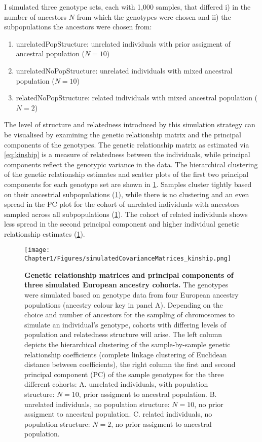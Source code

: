 I simulated three genotype sets, each with 1,000 samples, that differed i) in the number of ancestors \(N\) from which the genotypes were chosen and ii) the subpopulations the ancestors were chosen from:
\begin{enumerate}
\item unrelatedPopStructure: unrelated individuals with prior assigment of ancestral population  (\(N=10\))
\item unrelatedNoPopStructure: unrelated individuals with mixed ancestral population  (\(N=10\))
\item relatedNoPopStructure: related individuals with mixed ancestral population (\(N=2\))
\end{enumerate}


The level of structure and relatedness introduced by this simulation strategy can be visualised by examining the genetic relationship matrix and the principal components of the genotypes. The genetic relationship matrix as estimated via \cref{eq:kinship} is a measure of relatedness between the individuals, while principal components reflect the genotypic variance in the data. The hierarchical clustering of the genetic relationship estimates and scatter plots of the first two principal components for each genotype set are shown in \cref{fig:kinship-matrices}. Samples cluster tightly based on their ancestrial subpopulations (\cref{fig:kinship-matrices}), while there is no clustering and an even spread in the PC plot for the cohort of unrelated individuals with ancestors sampled across all subpopulations (\cref{fig:kinship-matrices}). The cohort of related individuals shows less spread in the second principal component and higher individual genetic relationship  estimates (\cref{fig:kinship-matrices}).


\begin{figure}[htbp]
	\centering
	\texttt{[image: Chapter1/Figures/simulatedCovarianceMatrices\_kinship.png]}
	\caption[\textbf{Genetic relationship matrices and principal components of three simulated European ancestry cohorts.}]{\textbf{Genetic relationship matrices and principal components of three simulated European ancestry cohorts.} The genotypes were simulated based on genotype data from four European ancestry populations (ancestry colour key in panel A). Depending on the choice and number of ancestors for the sampling of chromosomes to simulate an individual's genotype, cohorts with differing levels of population and relatedness structure will arise. The left column depicts the hierarchical clustering of the sample-by-sample  genetic relationship coefficients (complete linkage clustering of Euclidean distance between coefficients), the right column the first and second principal component (PC) of the sample genotypes for the three different cohorts: A. unrelated individuals, with population structure: \(N=10\), prior assigment to ancestral population. B. unrelated individuals, no population structure: \(N=10\), no prior assigment to ancestral population. C. related individuals, no population structure: \(N=2\), no prior assigment to ancestral population.}
 	\label{fig:kinship-matrices}
\end{figure}


